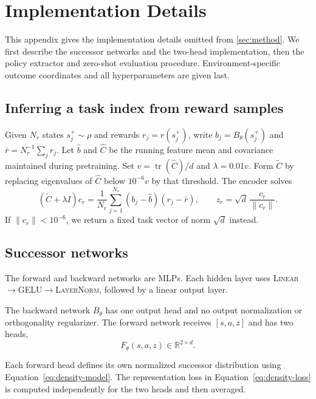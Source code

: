 \section{Implementation Details}
\label{app:implementation}

This appendix gives the implementation details omitted from \cref{sec:method}.
We first describe the successor networks and the two-head implementation, then the policy extractor and zero-shot evaluation procedure.
Environment-specific outcome coordinates and all hyperparameters are given last.

\subsection{Inferring a task index from reward samples}
\label{app:task-index}

Given $N_r$ states $s_j^+\sim\rho$ and rewards $r_j=r(s_j^+)$, write $b_j=B_\theta(s_j^+)$ and $\bar r=N_r^{-1}\sum_jr_j$.
Let $\widehat b$ and $\widehat C$ be the running feature mean and covariance maintained during pretraining.
Set $v=\operatorname{tr}(\widehat C)/d$ and $\lambda=0.01v$.
Form $\widetilde C$ by replacing eigenvalues of $\widehat C$ below $10^{-6}v$ by that threshold.
The encoder solves
\begin{equation}
    (\widetilde C+\lambda I)c_r =\frac1{N_r}\sum_{j=1}^{N_r} (b_j-\widehat b)(r_j-\bar r), \qquad z_r=\sqrt d\,\frac{c_r}{\|c_r\|}.
    \label{eq:app-task-index}
\end{equation}
If $\|c_r\|<10^{-6}$, we return a fixed task vector of norm $\sqrt d$ instead.

\subsection{Successor networks}
\label{app:networks}

The forward and backward networks are MLPs.
Each hidden layer uses \textsc{Linear}$\rightarrow$\textsc{GELU}$\rightarrow$\textsc{LayerNorm}, followed by a linear output layer.

The backward network $B_\theta$ has one output head and no output normalization or orthogonality regularizer.
The forward network receives $[s,a,z]$ and has two heads,
\begin{equation}
    F_\theta(s,a,z) \in \mathbb R^{2\times d}.
\end{equation}

Each forward head defines its own normalized successor distribution using Equation~\eqref{eq:density-model}.
The representation loss in Equation~\eqref{eq:density-loss} is computed independently for the two heads and then averaged.

